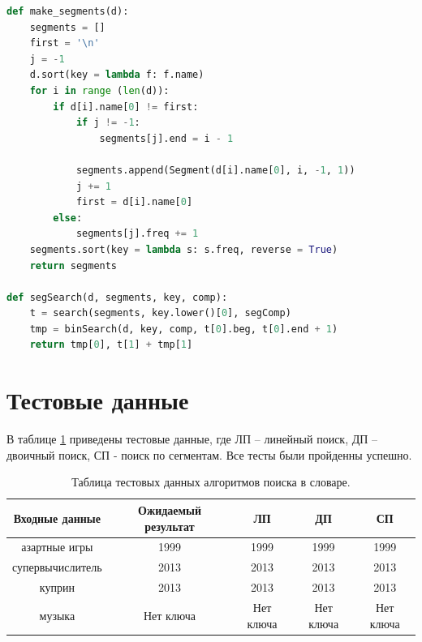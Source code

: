 \documentclass[12pt]{report}
\begin{document}
\begin{lstlisting}[label=ss_code,caption=Алгоритм поиска по сегментам, language=Python]
def make_segments(d):
    segments = []
    first = '\n'
    j = -1
    d.sort(key = lambda f: f.name)
    for i in range (len(d)):
        if d[i].name[0] != first:
            if j != -1:
                segments[j].end = i - 1
            
            segments.append(Segment(d[i].name[0], i, -1, 1))
            j += 1
            first = d[i].name[0]
        else:
            segments[j].freq += 1
    segments.sort(key = lambda s: s.freq, reverse = True)
    return segments
    
def segSearch(d, segments, key, comp):
    t = search(segments, key.lower()[0], segComp)
    tmp = binSearch(d, key, comp, t[0].beg, t[0].end + 1)
    return tmp[0], t[1] + tmp[1]
\end{lstlisting}
	
\section{Тестовые данные}

В таблице \ref{test_table} приведены тестовые данные, где ЛП -- линейный поиск, ДП -- двоичный поиск, СП - поиск по сегментам. Все тесты были пройденны успешно.

\begin{table}[H]
	\caption{Таблица тестовых данных алгоритмов поиска в словаре.}
	\label{test_table}
	\begin{center}

		\begin{tabular}{|c c c c c|} 

			\hline

			Входные данные & Ожидаемый результат & ЛП & ДП & СП \\  

			\hline

			азартные игры & 1999 & 1999 & 1999 & 1999 \\

			\hline

			супервычислитель & 2013 & 2013 & 2013 & 2013 \\

			\hline

			куприн & 2013 & 2013 & 2013 & 2013 \\

			\hline

			музыка & Нет ключа & Нет ключа & Нет ключа & Нет ключа \\
			\hline
		\end{tabular}

	\end{center}

\end{table}
	
\end{document}
